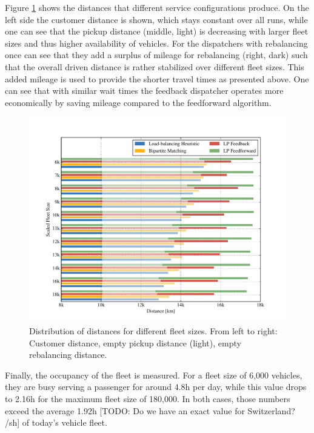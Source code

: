 
Figure \ref{fig:distances} shows the distances that different service configurations
produce. On the left side the customer distance is shown, which stays constant
over all runs, while one can see that the pickup distance (middle, light) is decreasing
with larger fleet sizes and thus higher availability of vehicles. For the dispatchers
with rebalancing once can see that they add a surplus of mileage for rebalancing (right, dark)
such that the overall driven distance is rather stabilized over different fleet sizes.
This added mileage is used to provide the shorter travel times as presented above.
One can see that with similar wait times the feedback dispatcher operates more economically
by saving mileage compared to the feedforward algorithm.

\begin{figure}
\includegraphics[width=1.0\textwidth]{figures/distances.pdf}
\caption{Distribution of distances for different fleet sizes. From left to right:
Customer distance, empty pickup distance (light), empty rebalancing distance.}
\label{fig:distances}
\end{figure}

Finally, the occupancy of the fleet is measured. For a fleet size of 6,000
vehicles, they are busy serving a passenger for around 4.8h per day, while
this value drops to 2.16h for the maximum fleet size of 180,000. In both cases,
those numbers exceed the average 1.92h [TODO: Do we have an exact value for Switzerland? /sh] of today's vehicle fleet.

